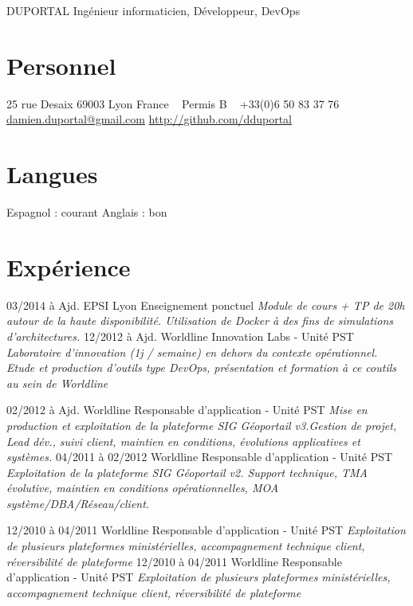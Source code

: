 \documentclass[]{friggeri-cv}
\begin{document}
 {DUPORTAL}
       {Ingénieur informaticien, Développeur, DevOps}


\begin{aside}
  \section{Personnel}
    25 rue Desaix
    69003 Lyon
    France
    ~
    Permis B
    ~
    +33(0)6 50 83 37 76
    \href{mailto:damien.duportal@gmail.com}{damien.duportal@gmail.com}
    \href{http://github.com/dduportal}{http://github.com/dduportal}
  \section{Langues} 
    Espagnol : courant
    Anglais : bon
\end{aside}

\section{Expérience}

\begin{entrylist}
  \entry
    {03/2014 à Ajd.}
    {EPSI Lyon}
    {Enseignement ponctuel}
    {\emph{Module de cours + TP de 20h autour de la haute disponibilité. Utilisation de Docker à des fins de simulations d'architectures.}}
  \entry
    {12/2012 à Ajd.}
    {Worldline}
    {Innovation Labs - Unité PST}
    {\emph{Laboratoire d'innovation (1j / semaine) en dehors du contexte opérationnel. Etude et production d'outils type DevOps, présentation et formation à ce coutils au sein de Worldline}}

  \entry
    {02/2012 à Ajd.}
    {Worldline}
    {Responsable d'application - Unité PST}
    {\emph{Mise en production et exploitation de la plateforme SIG Géoportail v3.Gestion de projet, Lead dév., suivi client, maintien en conditions, évolutions applicatives et systèmes.}}
  \entry
    {04/2011 à 02/2012}
    {Worldline}
    {Responsable d'application - Unité PST}
    {\emph{Exploitation de la plateforme SIG Géoportail v2. Support technique, TMA évolutive, maintien en conditions opérationnelles, MOA système/DBA/Réseau/client.}}

  \entry
    {12/2010 à 04/2011}
    {Worldline}
    {Responsable d'application - Unité PST}
    {\emph{Exploitation de plusieurs plateformes ministérielles, accompagnement technique client, réversibilité de plateforme}}
  \entry
    {12/2010 à 04/2011}
    {Worldline}
    {Responsable d'application - Unité PST}
    {\emph{Exploitation de plusieurs plateformes ministérielles, accompagnement technique client, réversibilité de plateforme}}
  
\end{entrylist}
\end{document}
